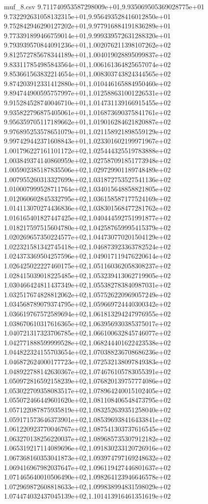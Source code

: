 \begin{filecontents*}{muf_8.csv}
9.711740953587298009e+01,9.935069505369028775e+01
9.732292631058132315e+01,9.956493528416012850e+01
9.752842946290127202e+01,9.977916884191836289e+01
9.773391899466759014e+01,9.999339572631288320e+01
9.793939570844091236e+01,1.002076211398107262e+02
9.812572785678344189e+01,1.004019028895099837e+02
9.833117854985843564e+01,1.006161364825657074e+02
9.853661563832214654e+01,1.008303743824344565e+02
9.874203912331412880e+01,1.010446165884950460e+02
9.894744900595757997e+01,1.012588631001226531e+02
9.915284528740046710e+01,1.014731139166915455e+02
9.935822796875405061e+01,1.016873690375841761e+02
9.956359705117189662e+01,1.019016284621820887e+02
9.976895253578651079e+01,1.021158921898559129e+02
9.997429442371608843e+01,1.023301602199971967e+02
1.001796227161101172e+02,1.025444325519783888e+02
1.003849374140860959e+02,1.027587091851773948e+02
1.005902385187835506e+02,1.029729901189748489e+02
1.007955260313327699e+02,1.031872753527541136e+02
1.010007999528711764e+02,1.034015648858821805e+02
1.012060602845332795e+02,1.036158587177524169e+02
1.014113070274436836e+02,1.038301568477281762e+02
1.016165401827447425e+02,1.040444592751991877e+02
1.018217597515604780e+02,1.042587659995415379e+02
1.020269657350224577e+02,1.044730770201504129e+02
1.022321581342745418e+02,1.046873923363782524e+02
1.024373369504257596e+02,1.049017119476220614e+02
1.026425022227460175e+02,1.051160362058308237e+02
1.028415039018225485e+02,1.053239413062719905e+02
1.030466424811437349e+02,1.055382783840987031e+02
1.032517674828812062e+02,1.057526220969057249e+02
1.034568789079374795e+02,1.059669724440300342e+02
1.036619767572589694e+02,1.061813294247976955e+02
1.038670610317616365e+02,1.063956930385375017e+02
1.040721317323706785e+02,1.066100632845746077e+02
1.042771888599999528e+02,1.068244401622423538e+02
1.044822324155703654e+02,1.070388236708686236e+02
1.046872624000177723e+02,1.072532138097849383e+02
1.048922788142630367e+02,1.074676105783055391e+02
1.050972816592158239e+02,1.076820139757774086e+02
1.053022709358083517e+02,1.078964240015102405e+02
1.055072466449601620e+02,1.081108406548473795e+02
1.057122087875935819e+02,1.083252639351258040e+02
1.059171573646373901e+02,1.085396938416433841e+02
1.061220923770046767e+02,1.087541303737616545e+02
1.063270138256220037e+02,1.089685735307912182e+02
1.065319217114089696e+02,1.091830233120726916e+02
1.067368160353041873e+02,1.093974797169248632e+02
1.069416967982037647e+02,1.096119427446801637e+02
1.071465640010506490e+02,1.098264123946646578e+02
1.072969872608818633e+02,1.099838994831598029e+02
1.074474032437045139e+02,1.101413916461351619e+02

\end{filecontents*}
